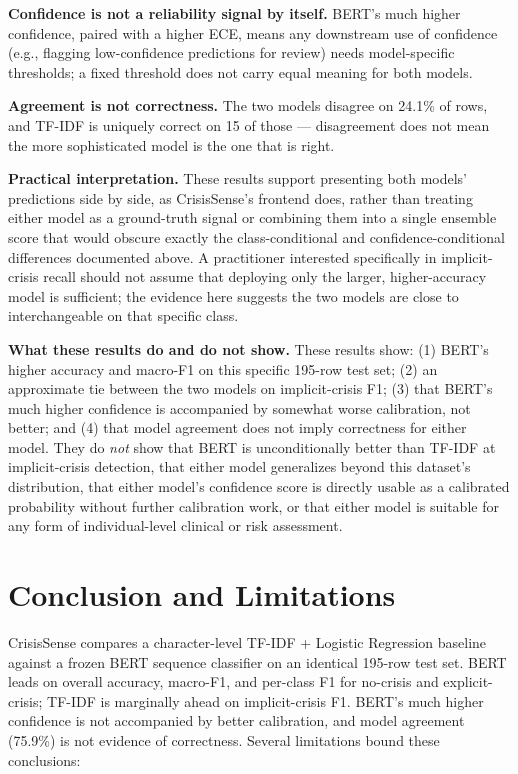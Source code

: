 \documentclass[12pt,a4paper]{article}
\begin{document}
\textbf{Confidence is not a reliability signal by itself.} BERT's much higher confidence, paired with a higher ECE, means any downstream use of confidence (e.g., flagging low-confidence predictions for review) needs model-specific thresholds; a fixed threshold does not carry equal meaning for both models.

\textbf{Agreement is not correctness.} The two models disagree on 24.1\% of rows, and TF-IDF is uniquely correct on 15 of those --- disagreement does not mean the more sophisticated model is the one that is right.

\textbf{Practical interpretation.} These results support presenting both models' predictions side by side, as CrisisSense's frontend does, rather than treating either model as a ground-truth signal or combining them into a single ensemble score that would obscure exactly the class-conditional and confidence-conditional differences documented above. A practitioner interested specifically in implicit-crisis recall should not assume that deploying only the larger, higher-accuracy model is sufficient; the evidence here suggests the two models are close to interchangeable on that specific class.

\textbf{What these results do and do not show.} These results show: (1) BERT's higher accuracy and macro-F1 on this specific 195-row test set; (2) an approximate tie between the two models on implicit-crisis F1; (3) that BERT's much higher confidence is accompanied by somewhat worse calibration, not better; and (4) that model agreement does not imply correctness for either model. They do \emph{not} show that BERT is unconditionally better than TF-IDF at implicit-crisis detection, that either model generalizes beyond this dataset's distribution, that either model's confidence score is directly usable as a calibrated probability without further calibration work, or that either model is suitable for any form of individual-level clinical or risk assessment.

\section{Conclusion and Limitations}

CrisisSense compares a character-level TF-IDF + Logistic Regression baseline against a frozen BERT sequence classifier on an identical 195-row test set. BERT leads on overall accuracy, macro-F1, and per-class F1 for no-crisis and explicit-crisis; TF-IDF is marginally ahead on implicit-crisis F1. BERT's much higher confidence is not accompanied by better calibration, and model agreement (75.9\%) is not evidence of correctness. Several limitations bound these conclusions:
\end{document}
